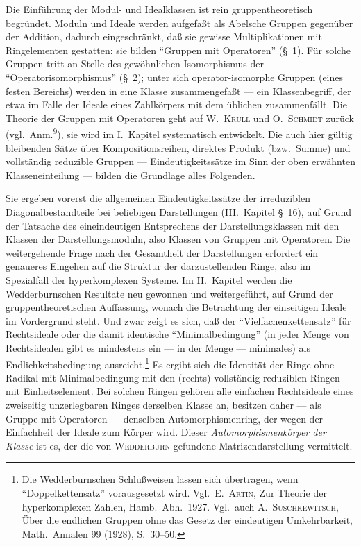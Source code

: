 \documentclass[12pt,a4paper]{article}
\theoremstyle{definition}
\begin{document}
Die Einf\"uhrung der Modul- und Idealklassen ist rein gruppentheoretisch
begr\"undet. Moduln und Ideale werden aufgefa\ss t als Abelsche Gruppen
gegen\"uber der Addition, dadurch eingeschr\"ankt, da\ss{} sie gewisse
Multiplikationen mit Ringelementen gestatten: sie bilden ``Gruppen mit
Operatoren'' (\S~1). F\"ur solche Gruppen tritt an Stelle des gew\"ohnlichen
Isomorphismus der ``Operatorisomorphismus'' (\S~2); unter sich
operator-isomorphe Gruppen (eines festen Bereichs) werden in eine Klasse
zusammengefa\ss t --- ein Klassenbegriff, der etwa im Falle der Ideale
eines Zahlk\"orpers mit dem \"ublichen zusammenf\"allt. Die Theorie der
Gruppen mit Operatoren geht auf W.\ \textsc{Krull} und O.\ \textsc{Schmidt}
zur\"uck (vgl.\ Anm.\textsuperscript{9}), sie wird im I.\ Kapitel systematisch
entwickelt. Die auch hier g\"ultig bleibenden S\"atze \"uber
Kompositionsreihen, direktes Produkt (bzw.\ Summe) und vollst\"andig
reduzible Gruppen --- Eindeutigkeitss\"atze im Sinn der oben erw\"ahnten
Klasseneinteilung --- bilden die Grundlage alles Folgenden.

Sie ergeben vorerst die allgemeinen Eindeutigkeitss\"atze der irreduziblen
Diagonalbestandteile bei beliebigen Darstellungen (III.\ Kapitel \S~16),
auf Grund der Tatsache des eineindeutigen Entsprechens der
Darstellungsklassen mit den Klassen der Darstellungsmoduln, also Klassen
von Gruppen mit Operatoren. Die weitergehende Frage nach der Gesamtheit
der Darstellungen erfordert ein genaueres Eingehen auf die Struktur der
darzustellenden Ringe, also im Spezialfall der hyperkomplexen Systeme.
Im II.\ Kapitel werden die Wedderburnschen Resultate neu gewonnen und
weitergef\"uhrt, auf Grund der gruppentheoretischen Auffassung, wonach
die Betrachtung der einseitigen Ideale im Vordergrund steht. Und zwar
zeigt es sich, da\ss{} der ``Vielfachenkettensatz'' f\"ur Rechtsideale oder
die damit identische ``Minimalbedingung'' (in jeder Menge von
Rechtsidealen gibt es mindestens ein --- in der Menge --- minimales) als
Endlichkeitsbedingung ausreicht.\footnote{Die Wedderburnschen
Schlu\ss weisen lassen sich \"ubertragen, wenn ``Doppelkettensatz''
vorausgesetzt wird. Vgl.\ E.\ \textsc{Artin}, Zur Theorie der
hyperkomplexen Zahlen, Hamb.\ Abh.\ 1927. Vgl.\ auch A.\ \textsc{Suschkewitsch},
\"Uber die endlichen Gruppen ohne das Gesetz der eindeutigen
Umkehrbarkeit, Math.\ Annalen 99 (1928), S.\ 30--50.} Es ergibt sich die
Identit\"at der Ringe ohne Radikal mit Minimalbedingung mit den (rechts)
vollst\"andig reduziblen Ringen mit Einheitselement. Bei solchen Ringen
geh\"oren alle einfachen Rechtsideale eines zweiseitig unzerlegbaren
Ringes derselben Klasse an, besitzen daher --- als Gruppe mit Operatoren
--- denselben Automorphismenring, der wegen der Einfachheit der Ideale
zum K\"orper wird. Dieser \textit{Automorphismenk\"orper der Klasse} ist
es, der die von \textsc{Wedderburn} gefundene Matrizendarstellung
vermittelt.
\end{document}
